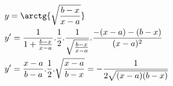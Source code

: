 \begin{ex}
\begin{align}
&y=\arctg{\sqrt{\frac{b-x}{x-a}}}\nonumber\\
&y'=\frac{1}{1+\frac{b-x}{x-a}}.\frac{1}{2}.\frac{1}{\sqrt{\frac{b-x}{x-a}}}.\frac{-(x-a)-(b-x)}{(x-a)^2}\nonumber\\
&y'=\frac{x-a}{b-a}.\frac{1}{2}.\sqrt{\frac{x-a}{b-x}}=-\frac{1}{2\sqrt{(x-a)(b-x)}}\nonumber
\end{align}
\end{ex}